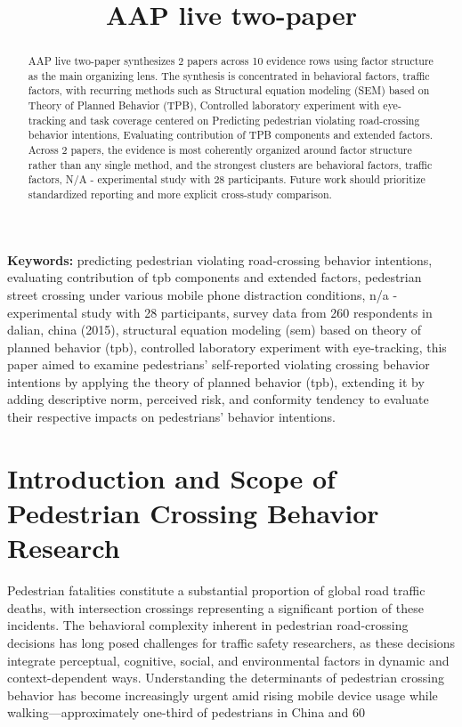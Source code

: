 \documentclass{article}
\title{AAP live two-paper}
\begin{document}
\maketitle
\begin{abstract}
AAP live two-paper synthesizes 2 papers across 10 evidence rows using factor structure as the main organizing lens. The synthesis is concentrated in behavioral factors, traffic factors, with recurring methods such as Structural equation modeling (SEM) based on Theory of Planned Behavior (TPB), Controlled laboratory experiment with eye-tracking and task coverage centered on Predicting pedestrian violating road-crossing behavior intentions, Evaluating contribution of TPB components and extended factors. Across 2 papers, the evidence is most coherently organized around factor structure rather than any single method, and the strongest clusters are behavioral factors, traffic factors, N/A - experimental study with 28 participants. Future work should prioritize standardized reporting and more explicit cross-study comparison.
\end{abstract}
\noindent\textbf{Keywords:} predicting pedestrian violating road-crossing behavior intentions, evaluating contribution of tpb components and extended factors, pedestrian street crossing under various mobile phone distraction conditions, n/a - experimental study with 28 participants, survey data from 260 respondents in dalian, china (2015), structural equation modeling (sem) based on theory of planned behavior (tpb), controlled laboratory experiment with eye-tracking, this paper aimed to examine pedestrians' self-reported violating crossing behavior intentions by applying the theory of planned behavior (tpb), extending it by adding descriptive norm, perceived risk, and conformity tendency to evaluate their respective impacts on pedestrians' behavior intentions.
\section{Introduction and Scope of Pedestrian Crossing Behavior Research}
Pedestrian fatalities constitute a substantial proportion of global road traffic deaths, with intersection crossings representing a significant portion of these incidents. The behavioral complexity inherent in pedestrian road-crossing decisions has long posed challenges for traffic safety researchers, as these decisions integrate perceptual, cognitive, social, and environmental factors in dynamic and context-dependent ways. Understanding the determinants of pedestrian crossing behavior has become increasingly urgent amid rising mobile device usage while walking—approximately one-third of pedestrians in China and 60%
\end{document}
